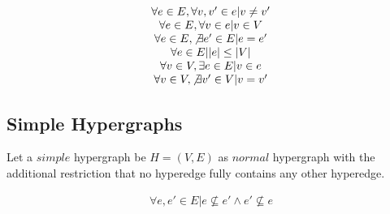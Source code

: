 \begin{equation*}
\begin{matrix}
\forall e \in E , \forall v, v' \in e \vert v \ne v'\\
\forall e \in E , \forall v \in e \vert v \in V\\
\forall e \in E , \not\exists e' \in E \vert e = e'\\
\forall e \in E \vert |e| \le |V|\\
\forall v \in V , \exists e \in E \vert v \in e\\
\forall v \in V , \not\exists v' \in V \vert v = v'\\
\end{matrix}
\end{equation*}

\subsection{Simple Hypergraphs}
\begin{definition}
Let a $simple$ hypergraph be $H=(V,E)$ as $normal$ hypergraph with the additional restriction that no hyperedge fully contains any other hyperedge. 
\end{definition}
\begin{equation*}
\begin{matrix}
\forall e , e' \in E \vert e \not \subseteq e' \wedge e' \not \subseteq e\\
\end{matrix}
\end{equation*}